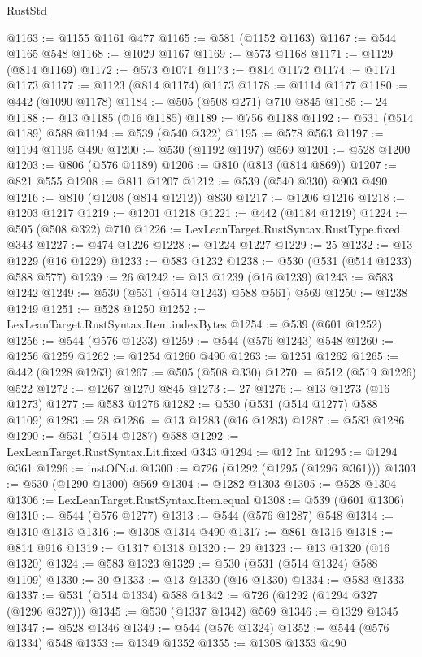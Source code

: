 \begin{lexlean}{RustStd}
\begin{coremodule}
@1163 := @1155 @1161 @477
@1165 := @581 (@1152 @1163)
@1167 := @544 @1165 @548
@1168 := @1029 @1167
@1169 := @573 @1168
@1171 := @1129 (@814 @1169)
@1172 := @573 @1071
@1173 := @814 @1172
@1174 := @1171 @1173
@1177 := @1123 (@814 @1174) @1173
@1178 := @1114 @1177
@1180 := @442 (@1090 @1178)
@1184 := @505 (@508 @271) @710 @845
@1185 := 24
@1188 := @13 @1185 (@16 @1185)
@1189 := @756 @1188
@1192 := @531 (@514 @1189) @588
@1194 := @539 (@540 @322)
@1195 := @578 @563
@1197 := @1194 @1195 @490
@1200 := @530 (@1192 @1197) @569
@1201 := @528 @1200
@1203 := @806 (@576 @1189)
@1206 := @810 (@813 (@814 @869))
@1207 := @821 @555
@1208 := @811 @1207
@1212 := @539 (@540 @330) @903 @490
@1216 := @810 (@1208 (@814 @1212)) @830
@1217 := @1206 @1216
@1218 := @1203 @1217
@1219 := @1201 @1218
@1221 := @442 (@1184 @1219)
@1224 := @505 (@508 @322) @710
@1226 := LexLeanTarget.RustSyntax.RustType.fixed @343
@1227 := @474 @1226
@1228 := @1224 @1227
@1229 := 25
@1232 := @13 @1229 (@16 @1229)
@1233 := @583 @1232
@1238 := @530 (@531 (@514 @1233) @588 @577)
@1239 := 26
@1242 := @13 @1239 (@16 @1239)
@1243 := @583 @1242
@1249 := @530 (@531 (@514 @1243) @588 @561) @569
@1250 := @1238 @1249
@1251 := @528 @1250
@1252 := LexLeanTarget.RustSyntax.Item.indexBytes
@1254 := @539 (@601 @1252)
@1256 := @544 (@576 @1233)
@1259 := @544 (@576 @1243) @548
@1260 := @1256 @1259
@1262 := @1254 @1260 @490
@1263 := @1251 @1262
@1265 := @442 (@1228 @1263)
@1267 := @505 (@508 @330)
@1270 := @512 (@519 @1226) @522
@1272 := @1267 @1270 @845
@1273 := 27
@1276 := @13 @1273 (@16 @1273)
@1277 := @583 @1276
@1282 := @530 (@531 (@514 @1277) @588 @1109)
@1283 := 28
@1286 := @13 @1283 (@16 @1283)
@1287 := @583 @1286
@1290 := @531 (@514 @1287) @588
@1292 := LexLeanTarget.RustSyntax.Lit.fixed @343
@1294 := @12 Int
@1295 := @1294 @361
@1296 := instOfNat
@1300 := @726 (@1292 (@1295 (@1296 @361)))
@1303 := @530 (@1290 @1300) @569
@1304 := @1282 @1303
@1305 := @528 @1304
@1306 := LexLeanTarget.RustSyntax.Item.equal
@1308 := @539 (@601 @1306)
@1310 := @544 (@576 @1277)
@1313 := @544 (@576 @1287) @548
@1314 := @1310 @1313
@1316 := @1308 @1314 @490
@1317 := @861 @1316
@1318 := @814 @916
@1319 := @1317 @1318
@1320 := 29
@1323 := @13 @1320 (@16 @1320)
@1324 := @583 @1323
@1329 := @530 (@531 (@514 @1324) @588 @1109)
@1330 := 30
@1333 := @13 @1330 (@16 @1330)
@1334 := @583 @1333
@1337 := @531 (@514 @1334) @588
@1342 := @726 (@1292 (@1294 @327 (@1296 @327)))
@1345 := @530 (@1337 @1342) @569
@1346 := @1329 @1345
@1347 := @528 @1346
@1349 := @544 (@576 @1324)
@1352 := @544 (@576 @1334) @548
@1353 := @1349 @1352
@1355 := @1308 @1353 @490

\end{coremodule}
\end{lexlean}
